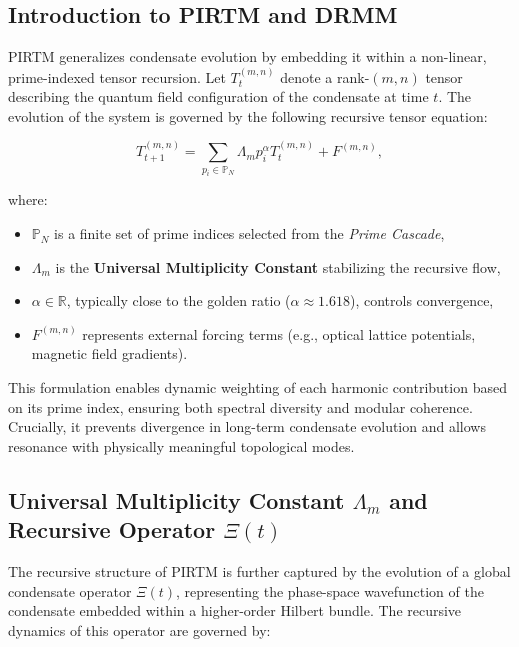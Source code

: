 \documentclass{article}
\theoremstyle{plain}
\begin{document}
\subsection{Introduction to PIRTM and DRMM}

PIRTM generalizes condensate evolution by embedding it within a non-linear, prime-indexed tensor recursion. Let \( T_t^{(m,n)} \) denote a rank-\((m,n)\) tensor describing the quantum field configuration of the condensate at time \( t \). The evolution of the system is governed by the following recursive tensor equation:

\begin{equation}
T_{t+1}^{(m,n)} = \sum_{p_i \in \mathbb{P}_N} \Lambda_m p_i^{\alpha} T_t^{(m,n)} + F^{(m,n)},
\end{equation}

where:
\begin{itemize}
    \item \( \mathbb{P}_N \) is a finite set of prime indices selected from the \textit{Prime Cascade}, 
    \item \( \Lambda_m \) is the \textbf{Universal Multiplicity Constant} stabilizing the recursive flow,
    \item \( \alpha \in \mathbb{R} \), typically close to the golden ratio (\( \alpha \approx 1.618 \)), controls convergence,
    \item \( F^{(m,n)} \) represents external forcing terms (e.g., optical lattice potentials, magnetic field gradients).
\end{itemize}

This formulation enables dynamic weighting of each harmonic contribution based on its prime index, ensuring both spectral diversity and modular coherence. Crucially, it prevents divergence in long-term condensate evolution and allows resonance with physically meaningful topological modes.

\subsection{Universal Multiplicity Constant \texorpdfstring{\(\Lambda_m\)}{Λm} and Recursive Operator \texorpdfstring{\(\Xi(t)\)}{Ξ(t)}}

The recursive structure of PIRTM is further captured by the evolution of a global condensate operator \( \Xi(t) \), representing the phase-space wavefunction of the condensate embedded within a higher-order Hilbert bundle. The recursive dynamics of this operator are governed by:
\end{document}
